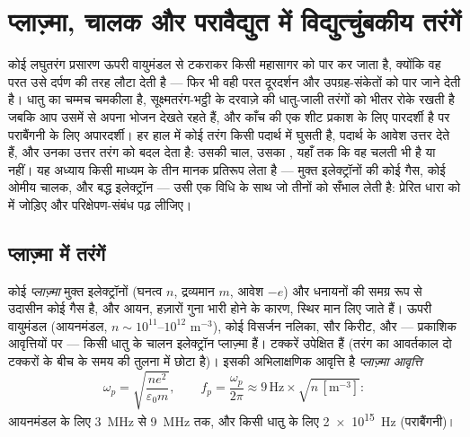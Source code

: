 \chapter{प्लाज़्मा, चालक और परावैद्युत में विद्युत्चुंबकीय तरंगें}\label{ch:b2:waves-in-media}

कोई लघुतरंग प्रसारण ऊपरी वायुमंडल से टकराकर किसी महासागर को पार कर
जाता है, क्योंकि वह परत उसे दर्पण की तरह लौटा देती है --- फिर भी वही परत
दूरदर्शन और उपग्रह-संकेतों को पार जाने देती है। धातु का चम्मच चमकीला है,
सूक्ष्मतरंग-भट्ठी के दरवाज़े की धातु-जाली तरंगों को भीतर रोके रखती है जबकि
आप उसमें से अपना भोजन देखते रहते हैं, और काँच की एक शीट प्रकाश के लिए
पारदर्शी है पर पराबैंगनी के लिए अपारदर्शी। हर हाल में कोई तरंग किसी
पदार्थ में घुसती है, पदार्थ के आवेश उत्तर देते हैं, और उनका उत्तर तरंग को
बदल देता है: उसकी चाल, उसका , यहाँ तक कि वह चलती भी है या नहीं।
यह अध्याय किसी माध्यम के तीन मानक प्रतिरूप लेता है --- मुक्त इलेक्ट्रॉनों की
कोई गैस, कोई ओमीय चालक, और बद्ध इलेक्ट्रॉन --- उसी एक विधि के साथ जो
तीनों को सँभाल लेती है: प्रेरित धारा को  में जोड़िए और
परिक्षेपण-संबंध पढ़ लीजिए।

\section{प्लाज़्मा में तरंगें}

\begin{definition}[प्लाज़्मा; मुक्त-इलेक्ट्रॉन प्रतिरूप]\label{def:b2:waves-in-media:plasma}
कोई \emph{प्लाज़्मा} मुक्त इलेक्ट्रॉनों (घनत्व
$n$, द्रव्यमान $m$, आवेश $-e$) और धनायनों की समग्र रूप से उदासीन कोई गैस
है, और आयन, हज़ारों गुना भारी होने के कारण, स्थिर मान लिए जाते हैं। ऊपरी
वायुमंडल (आयनमंडल, $n \sim 10^{11}$--$10^{12}$ m$^{-3}$), कोई विसर्जन नलिका,
सौर किरीट, और --- प्रकाशिक आवृत्तियों पर --- किसी धातु के चालन इलेक्ट्रॉन
प्लाज़्मा हैं। टक्करें उपेक्षित हैं (तरंग का आवर्तकाल दो टक्करों के बीच के
समय की तुलना में छोटा है)। इसकी अभिलाक्षणिक आवृत्ति है
\emph{प्लाज़्मा आवृत्ति}
\[
\omega_p = \sqrt{\frac{ne^2}{\varepsilon_0m}} , \qquad
f_p = \frac{\omega_p}{2\pi} \approx 9\,\text{Hz}\times\sqrt{n\,[\text{m}^{-3}]} :
\]
आयनमंडल के लिए \qty{3}{MHz} से \qty{9}{MHz} तक, और किसी धातु के लिए
\qty{2e15}{Hz} (पराबैंगनी)।
\end{definition}

